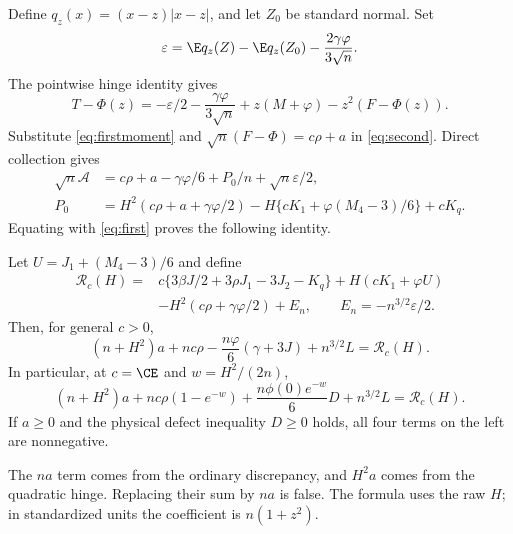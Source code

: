Define $q_z(x)=(x-z)|x-z|$, and let $Z_0$ be standard normal. Set
\[
 \varepsilon=\E q_z(Z)-\E q_z(Z_0)-\frac{2\gamma\varphi}{3\sqrt n}.
\]
The pointwise hinge identity gives
\[
 T-\Phi(z)=-\varepsilon/2-\frac{\gamma\varphi}{3\sqrt n}
                     +z(M+\varphi)-z^2(F-\Phi(z)).
\]
Substitute \eqref{eq:firstmoment} and
$\sqrt n(F-\Phi)=c\rho+a$ in \eqref{eq:second}. Direct collection gives
\begin{align*}
 \sqrt n\mathcal A&=c\rho+a-\gamma\varphi/6+P_0/n
                                          +\sqrt n\varepsilon/2,\\
 P_0&=H^2(c\rho+a+\gamma\varphi/2)
       -H\{cK_1+\varphi(M_4-3)/6\}+cK_q.
\end{align*}
Equating with \eqref{eq:first} proves the following identity.

\begin{theorem}\label{thm:identity}
Let $U=J_1+(M_4-3)/6$ and define
\begin{align*}
 \mathcal R_c(H)={}&c\{3\beta J/2+3\rho J_1-3J_2-K_q\}
    +H(cK_1+\varphi U)\\
 &-H^2(c\rho+\gamma\varphi/2)+E_n,
 \qquad E_n=-n^{3/2}\varepsilon/2.
\end{align*}
Then, for general $c>0$,
\begin{equation}\label{eq:general}
 (n+H^2)a+nc\rho-\frac{n\varphi}{6}(\gamma+3J)+n^{3/2}L
 =\mathcal R_c(H).
\end{equation}
In particular, at $c=\CE$ and $w=H^2/(2n)$,
\begin{equation}\label{eq:conserved}
 \boxed{(n+H^2)a+nc\rho(1-e^{-w})
   +\frac{n\phi(0)e^{-w}}6D+n^{3/2}L=\mathcal R_c(H).}
\end{equation}
If $a\ge0$ and the physical defect inequality $D\ge0$ holds, all four
terms on the left are nonnegative.
\end{theorem}
The $na$ term comes from the ordinary discrepancy, and $H^2a$ comes from
the quadratic hinge. Replacing their sum by $na$ is false. The formula
uses the raw $H$; in standardized units the coefficient is $n(1+z^2)$.

